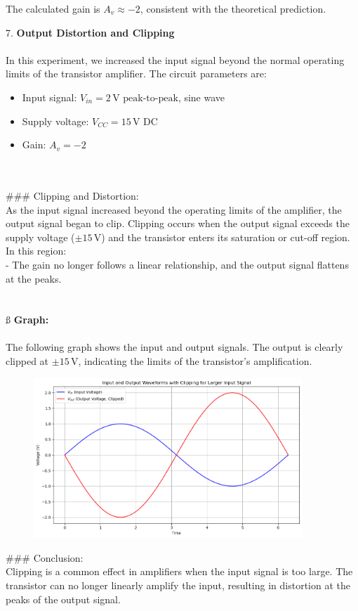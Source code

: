 \documentclass{article}
\begin{document}
The calculated gain is \( A_v \approx -2 \), consistent with the theoretical prediction.


7. \textbf{Output Distortion and Clipping} \\ \\

In this experiment, we increased the input signal beyond the normal operating limits of the transistor amplifier. The circuit parameters are:\\ 
\begin{itemize}
    \item Input signal: \( V_{in} = 2 \, \text{V peak-to-peak} \), sine wave
    \item Supply voltage: \( V_{CC} = 15 \, \text{V DC} \)
    \item Gain: \( A_v = -2 \)
\end{itemize}
\\ \\ 
### Clipping and Distortion: \\
As the input signal increased beyond the operating limits of the amplifier, the output signal began to clip. Clipping occurs when the output signal exceeds the supply voltage (\( \pm 15 \, \text{V} \)) and the transistor enters its saturation or cut-off region. In this region:
\\
- The gain no longer follows a linear relationship, and the output signal flattens at the peaks.\\ 
\\  \\ß
\textbf{Graph:} \\ \\
The following graph shows the input and output signals. The output is clearly clipped at \( \pm 15 \, \text{V} \), indicating the limits of the transistor’s amplification.
\begin{figure}[H]
    \centering
    \includegraphics[width=0.9\textwidth]{./img/Lab5_7.png}
    \caption{}
    \label{fig:graph1} 
\end{figure}


### Conclusion: \\ 
Clipping is a common effect in amplifiers when the input signal is too large. The transistor can no longer linearly amplify the input, resulting in distortion at the peaks of the output signal.
\end{document}
